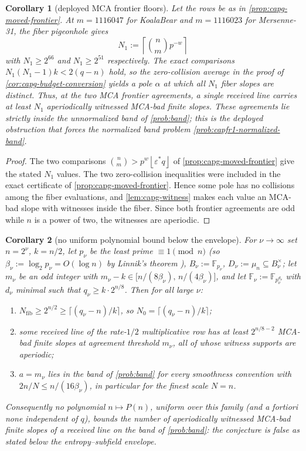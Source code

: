 \documentclass[11pt]{article}
\newtheorem{corollary}[corollary]{Corollary}
\theoremstyle{definition}
\theoremstyle{remark}
\newcommand{\F}{\mathbb{F}}
\providecommand{\ceil}[1]{\left\lceil #1\right\rceil}
\providecommand{\floor}[1]{\left\lfloor #1\right\rfloor}
\begin{document}
\begin{corollary}[deployed MCA frontier floors]
\label{cor:capg-deployed-floor}
Let the rows be as in \cref{prop:capg-moved-frontier}.  At
$m=1116047$ for KoalaBear and $m=1116023$ for Mersenne-31, the fiber
pigeonhole gives
\[
        N_1:=\ceil{\binom nm p^{-w}}
\]
with $N_1\ge2^{66}$ and $N_1\ge2^{51}$ respectively.  The exact comparisons
$N_1(N_1-1)k<2(q-n)$ hold, so the zero-collision average in the proof of
\cref{cor:capg-budget-conversion} yields a pole $\alpha$ at which all $N_1$
fiber slopes are distinct.  Thus, at the two MCA frontier agreements, a
single received line carries at least $N_1$ aperiodically witnessed MCA-bad
finite slopes.  These agreements lie strictly inside the unnormalized band of
\cref{prob:band}; this is the deployed obstruction that forces the normalized
band problem \cref{prob:capfr1-normalized-band}.
\end{corollary}

\begin{proof}
The two comparisons $\binom nm>p^{w}\floor{\varepsilon^*q}$ of
\cref{prop:capg-moved-frontier} give the stated $N_1$ values.  The two
zero-collision inequalities were included in the exact certificate of
\cref{prop:capg-moved-frontier}.  Hence some pole has no collisions among the
fiber evaluations, and \cref{lem:capg-witness} makes each value an MCA-bad
slope with witnesses inside the fiber.  Since both frontier agreements are
odd while $n$ is a power of two, the witnesses are aperiodic.
\end{proof}


\begin{corollary}[no uniform polynomial bound below the
envelope]\label{cor:capg-asymptotic}
For $\nu\to\infty$ set $n=2^{\nu}$, $k=n/2$, let $p_\nu$ be the least prime
$\equiv 1\pmod n$ (so $\beta_\nu:=\log_2 p_\nu=O(\log n)$ by Linnik's theorem \cite{IK04}), $B_\nu:=\F_{p_\nu}$, $D_\nu:=\mu_n\subseteq B_\nu^{\times}$; let
$m_\nu$ be an odd integer with
$m_\nu-k\in\big[n/(8\beta_\nu),\,n/(4\beta_\nu)\big]$, and let
$\F_\nu:=\F_{p_\nu^{d_\nu}}$ with $d_\nu$ minimal such that
$q_\nu\geq k\cdot 2^{n/8}$.  Then for all large $\nu$:
\begin{enumerate}[label=(\alph*)]
\item $N_{\mathrm{fib}}\geq 2^{n/2}\geq\lceil(q_\nu-n)/k\rceil$, so
$N_0=\lceil(q_\nu-n)/k\rceil$;
\item some received line of the rate-$1/2$ multiplicative row has at least
$2^{n/8-2}$ MCA-bad finite slopes at agreement threshold $m_\nu$, all of
whose witness supports are aperiodic;
\item $a=m_\nu$ lies in the band of \cref{prob:band} for every smoothness
convention with $2n/N\leq n/(16\beta_\nu)$, in particular for the finest
scale $N=n$.
\end{enumerate}
Consequently no polynomial $n\mapsto P(n)$, uniform over this family (and a
fortiori none independent of $q$), bounds the number of aperiodically
witnessed MCA-bad finite slopes of a received line on the band of
\cref{prob:band}: the conjecture is false as stated below the
entropy--subfield envelope.
\end{corollary}
\end{document}
